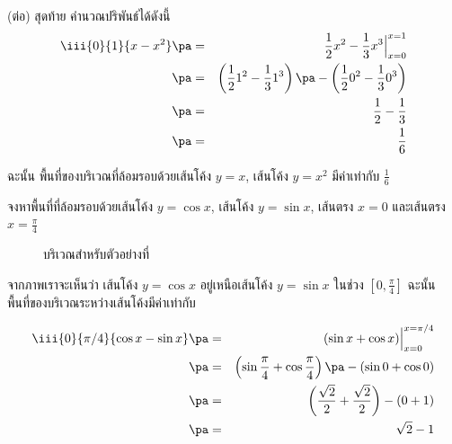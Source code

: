 \begin{frame}[t]
\begin{sol} (ต่อ) สุดท้าย คำนวณปริพันธ์ได้ดังนี้
\begin{eqnarray*}
\iii{0}{1}{x - x^2} \pa &=& \frac{1}{2}x^2 - \frac{1}{3}x^3 \Big|_{x=0}^{x=1} \\ \pa
&=& \left( \frac{1}{2} 1^2 - \frac{1}{3} 1^3\right) \pa - \left( \frac{1}{2}0^2 - \frac{1}{3}0^3\right) \\ \pa
&=& \frac{1}{2} - \frac{1}{3} \\  \pa
&=& \frac{1}{6}
\end{eqnarray*}

ฉะนั้น พื้นที่ของบริเวณที่ล้อมรอบด้วยเส้นโค้ง $y = x$, เส้นโค้ง $y = x^2$ มีค่าเท่ากับ $\frac{1}{6}$
\end{sol}
\end{frame}


\begin{frame}[t]
\begin{ex}
จงหาพื้นที่ที่ล้อมรอบด้วยเส้นโค้ง $y = \cos x$, เส้นโค้ง $y = \sin x$, เส้นตรง $x=0$ และเส้นตรง $x=\frac{\pi}{4}$
\end{ex}
\begin{slide}
\begin{figure}[h!]
\centering
{}
\caption{บริเวณสำหรับตัวอย่างที่ \theex}
\end{figure}
\end{slide}
\end{frame}

\begin{frame}
\begin{sol}
จากภาพเราจะเห็นว่า เส้นโค้ง $y = \cos x$ อยู่เหนือเส้นโค้ง $y = \sin x$ ในช่วง $[0,\tfrac{\pi}{4}]$ \pa ฉะนั้น พื้นที่ของบริเวณระหว่างเส้นโค้งมีค่าเท่ากับ \pa

\begin{eqnarray*}
\iii{0}{\pi/4}{\cos x - \sin x} \pa &=& (\sin x + \cos x) \Big|_{x=0}^{x=\pi/4} \\ \pa
&=& \left(\sin \frac{\pi}{4} + \cos \frac{\pi}{4} \right) \pa - (\sin 0 + \cos 0) \\ \pa
&=& \left(\frac{\sqrt{2}}{2} + \frac{\sqrt{2}}{2}\right) - (0+1) \\ \pa
&=& \sqrt{2} - 1
\end{eqnarray*}
\end{sol}
\end{frame}

